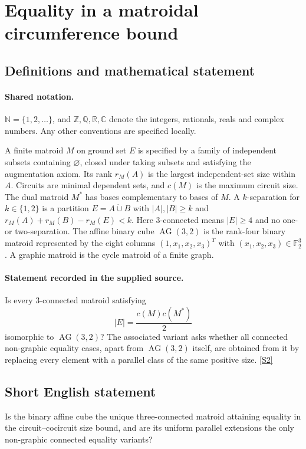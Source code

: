\documentclass[11pt]{book}
\newcommand{\sref}[2]{\hyperlink{source:#1:#2}{[S#2]}}
\begin{document}
\section{Equality in a matroidal circumference bound}\label{statement}

\subsection{Definitions and mathematical statement}

\paragraph{Shared notation.}$\mathbb N=\{1,2,\ldots\}$, and $\mathbb Z,\mathbb Q,\mathbb R,\mathbb C$ denote the integers, rationals, reals and complex numbers. Any other conventions are specified locally.


A finite matroid $M$ on ground set $E$ is specified by a family of independent subsets containing $\varnothing$, closed under taking subsets and satisfying the augmentation axiom. Its rank $r_M(A)$ is the largest independent-set size within $A$. Circuits are minimal dependent sets, and $c(M)$ is the maximum circuit size. The dual matroid $M^*$ has bases complementary to bases of $M$. A $k$-separation for $k\in\{1,2\}$ is a partition $E=A\mathbin{\dot\cup}B$ with $|A|,|B|\geq k$ and $r_M(A)+r_M(B)-r_M(E)<k$. Here $3$-connected means $|E|\geq4$ and no one- or two-separation. The affine binary cube $\operatorname{AG}(3,2)$ is the rank-four binary matroid represented by the eight columns $(1,x_1,x_2,x_3)^T$ with $(x_1,x_2,x_3)\in\mathbb F_2^3$. A graphic matroid is the cycle matroid of a finite graph.
\paragraph{Statement recorded in the supplied source.}
Is every $3$-connected matroid satisfying
\[|E|=\frac{c(M)c(M^*)}{2}\]
isomorphic to $\operatorname{AG}(3,2)$? The associated variant asks whether all connected non-graphic equality cases, apart from $\operatorname{AG}(3,2)$ itself, are obtained from it by replacing every element with a parallel class of the same positive size. \sref{statement}{2}
\subsection{Short English statement}
Is the binary affine cube the unique three-connected matroid attaining equality in the circuit--cocircuit size bound, and are its uniform parallel extensions the only non-graphic connected equality variants?
\end{document}

